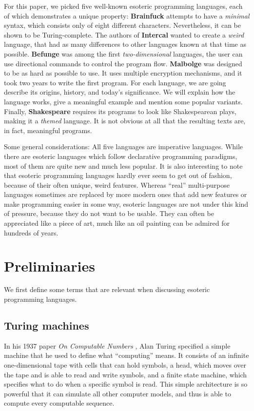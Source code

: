 \documentclass{sig-alternate}
\begin{document}
For this paper, we picked five well-known esoteric programming languages, each of which demonstrates a unique property:
\textbf{Brainfuck} attempts to have a \textit{minimal} syntax, which consists only of eight different characters. Nevertheless, it can be shown to be Turing-complete. The authors of \textbf{Intercal} wanted to create a \textit{weird} language, that had as many differences to other languages known at that time as possible. \textbf{Befunge} was among the first \textit{two-dimensional} languages, the user can use directional commands to control the program flow. \textbf{Malbolge} was designed to be as hard as possible to use. It uses multiple encryption mechanisms, and it took two years to write the first program. For each language, we are going describe its origins, history, and today's significance. We will explain how the language works, give a meaningful example and mention some popular variants. Finally, \textbf{Shakespeare} requires its programs to look like Shakespearean plays, making it a \textit{themed} language. It is not obvious at all that the resulting texts are, in fact, meaningful programs.

Some general considerations: All five languages are imperative languages. While there are esoteric languages which follow declarative programming paradigms, most of them are quite new and much less popular. It is also interesting to note that esoteric programming languages hardly ever seem to get out of fashion, because of their often unique, weird features. Whereas “real” multi-purpose languages sometimes are replaced by more modern ones that add new features or make programming easier in some way, esoteric languages are not under this kind of pressure, because they do not want to be usable. They can often be appreciated like a piece of art, much like an oil painting can be admired for hundreds of years.

\section{Preliminaries}

We first define some terms that are relevant when discussing esoteric programming languages.

\subsection{Turing machines}

In his 1937 paper \emph{On Computable Numbers} \cite{turing1937computable}, Alan Turing specified a simple machine that he used to define what “computing” means. It consists of an infinite one-dimensional tape with cells that can hold symbols, a head, which moves over the tape and is able to read and write symbols, and a finite state machine, which specifies what to do when a specific symbol is read. This simple architecture is so powerful that it can simulate all other computer models, and thus is able to compute every computable sequence.
\end{document}
